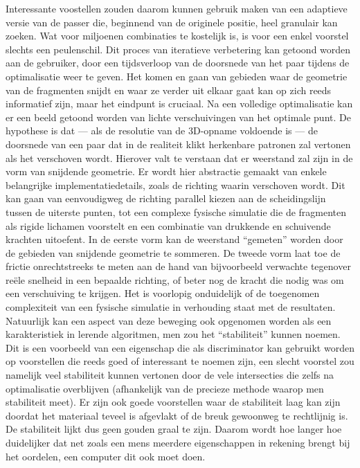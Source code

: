 Interessante voostellen zouden daarom kunnen gebruik maken van een adaptieve versie van de passer die, beginnend van de originele positie, heel granulair kan zoeken. Wat voor miljoenen combinaties te kostelijk is, is voor een enkel voorstel slechts een peulenschil. Dit proces van iteratieve verbetering kan getoond worden aan de gebruiker, door een tijdsverloop van de doorsnede van het paar tijdens de optimalisatie weer te geven. Het komen en gaan van gebieden waar de geometrie van de fragmenten snijdt en waar ze verder uit elkaar gaat kan op zich reeds informatief zijn, maar het eindpunt is cruciaal. Na een volledige optimalisatie kan er een beeld getoond worden van lichte verschuivingen van het optimale punt. De hypothese is dat --- als de resolutie van de 3D-opname voldoende is --- de doorsnede van een paar dat in de realiteit klikt herkenbare patronen zal vertonen als het verschoven wordt. Hierover valt te verstaan dat er weerstand zal zijn in de vorm van snijdende geometrie. Er wordt hier abstractie gemaakt van enkele belangrijke implementatiedetails, zoals de richting waarin verschoven wordt. Dit kan gaan van eenvoudigweg de richting parallel kiezen aan de scheidingslijn tussen de uiterste punten, tot een complexe fysische simulatie die de fragmenten als rigide lichamen voorstelt en een combinatie van drukkende en schuivende krachten uitoefent. In de eerste vorm kan de weerstand ``gemeten'' worden door de gebieden van snijdende geometrie te sommeren. De tweede vorm laat toe de frictie onrechtstreeks te meten aan de hand van bijvoorbeeld verwachte tegenover re\"ele snelheid in een bepaalde richting, of beter nog de kracht die nodig was om een verschuiving te krijgen. Het is voorlopig onduidelijk of de toegenomen complexiteit van een fysische simulatie in verhouding staat met de resultaten.\\

Natuurlijk kan een aspect van deze beweging ook opgenomen worden als een karakteristiek in lerende algoritmen, men zou het ``stabiliteit'' kunnen noemen. Dit is een voorbeeld van een eigenschap die als discriminator kan gebruikt worden op voorstellen die reeds goed of interessant te noemen zijn, een slecht voorstel zou namelijk veel stabiliteit kunnen vertonen door de vele intersecties die zelfs na optimalisatie overblijven (afhankelijk van de precieze methode waarop men stabiliteit meet). Er zijn ook goede voorstellen waar de stabiliteit laag kan zijn doordat het materiaal teveel is afgevlakt of de breuk gewoonweg te rechtlijnig is. De stabiliteit lijkt dus geen gouden graal te zijn. Daarom wordt hoe langer hoe duidelijker dat net zoals een mens meerdere eigenschappen in rekening brengt bij het oordelen, een computer dit ook moet doen.
